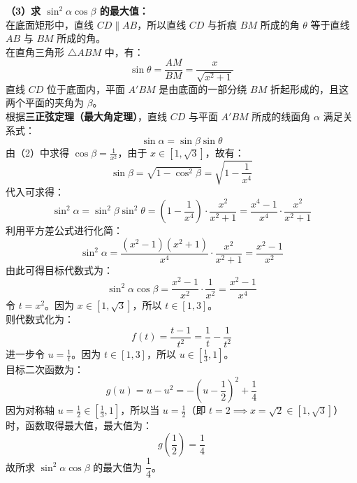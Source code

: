 {  \noindent\textbf{（3）求 $\sin^2\alpha \cos\beta$ 的最大值：}\\
  在底面矩形中，直线 $CD \parallel AB$，所以直线 $CD$ 与折痕 $BM$ 所成的角 $\theta$ 等于直线 $AB$ 与 $BM$ 所成的角。\\
  在直角三角形 $\triangle ABM$ 中，有：
  \[ \sin\theta = \frac{AM}{BM} = \frac{x}{\sqrt{x^2+1}} \]
  直线 $CD$ 位于底面内，平面 $A'BM$ 是由底面的一部分绕 $BM$ 折起形成的，且这两个平面的夹角为 $\beta$。\\
  根据\textbf{三正弦定理（最大角定理）}，直线 $CD$ 与平面 $A'BM$ 所成的线面角 $\alpha$ 满足关系式：
  \[ \sin\alpha = \sin\beta \sin\theta \]
  由（2）中求得 $\cos\beta = \frac{1}{x^2}$，由于 $x \in [1, \sqrt{3}]$，故有：
  \[ \sin\beta = \sqrt{1 - \cos^2\beta} = \sqrt{1 - \frac{1}{x^4}} \]
  代入可求得：
  \[ \sin^2\alpha = \sin^2\beta \sin^2\theta = \left(1 - \frac{1}{x^4}\right) \cdot \frac{x^2}{x^2+1} = \frac{x^4-1}{x^4} \cdot \frac{x^2}{x^2+1} \]
  利用平方差公式进行化简：
  \[ \sin^2\alpha = \frac{(x^2-1)(x^2+1)}{x^4} \cdot \frac{x^2}{x^2+1} = \frac{x^2-1}{x^2} \]
  由此可得目标代数式为：
  \[ \sin^2\alpha \cos\beta = \frac{x^2-1}{x^2} \cdot \frac{1}{x^2} = \frac{x^2-1}{x^4} \]
  令 $t = x^2$。因为 $x \in [1, \sqrt{3}]$，所以 $t \in [1, 3]$。\\
  则代数式化为：
  \[ f(t) = \frac{t-1}{t^2} = \frac{1}{t} - \frac{1}{t^2} \]
  进一步令 $u = \frac{1}{t}$。因为 $t \in [1, 3]$，所以 $u \in \left[\frac{1}{3}, 1\right]$。\\
  目标二次函数为：
  \[ g(u) = u - u^2 = -\left(u - \frac{1}{2}\right)^2 + \frac{1}{4} \]
  因为对称轴 $u = \frac{1}{2} \in \left[\frac{1}{3}, 1\right]$，所以当 $u = \frac{1}{2}$（即 $t = 2 \implies x = \sqrt{2} \in [1, \sqrt{3}]$）时，函数取得最大值，最大值为：
  \[ g\left(\frac{1}{2}\right) = \frac{1}{4} \]
  故所求 $\sin^2\alpha \cos\beta$ 的最大值为 $\boxed{\dfrac{1}{4}}$。
}

\newcommand{\qSolidFoldingRectangleDiagnosis}{%
  用于课堂精准提优训练。本题是一道非常经典的矩形折叠最值难题。重点考查折叠前后“长度与角度的守恒性”以及将动态几何特征转化为代数方程的能力。在解析中应引导学生识别出“三正弦定理”在求线面角最值中的应用，免去在折叠后的复杂空间体系中寻找线面角投影的繁琐作图过程。
}

\newcommand{\qSolidFoldingRectangleTeachingNotes}{%
  \item \textbf{教学核心与模型识别提示}：
    \begin{itemize}
      \item \textbf{折叠动力引擎}：引导学生先建立折起高 $A'E = \sqrt{1 - \frac{1}{x^2}}$ 与投影点位置 $BE = \frac{1}{x}$ 的代数关系，这是折叠模型中利用垂直平分性质建立等式的一个非常典型的“保距消元”手法，务必让学生彻底掌握这一推导。
      \item \textbf{三正弦定理的妙用}：第（3）问中，如果按照常规思路去寻找直线 $CD$ 在平面 $A'BM$ 上的投影来求线面角 $\alpha$，空间想象难度极大且极易出错。这里直接把底面看作平面 $\beta$，平面 $A'BM$ 看作平面 $\alpha$，直线 $CD$ 位于底面内，利用\textbf{三正弦定理} $\sin\alpha = \sin\beta \sin\theta$（线面角正弦 = 二面角正弦 $\times$ 面内线与交线夹角正弦），直接跳过了复杂的空间垂足寻找过程，是极佳的模型识别实战案例。
    \end{itemize}
}
